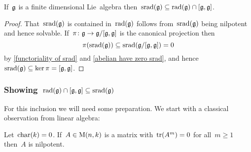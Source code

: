 \begin{corollary}
  \label{inclusion srad in intersection}
  If~$\mathfrak{g}$ is a finite dimensional Lie~algebra then~$\operatorname{srad}(\mathfrak{g}) \subseteq \operatorname{rad}(\mathfrak{g}) \cap [\mathfrak{g}, \mathfrak{g}]$.
\end{corollary}

\begin{proof}
  That~$\operatorname{srad}(\mathfrak{g})$ is contained in~$\operatorname{rad}(\mathfrak{g})$ follows from~$\operatorname{srad}(\mathfrak{g})$ being nilpotent and hence solvable.
  If~$\pi \colon \mathfrak{g} \to \mathfrak{g}/[\mathfrak{g}, \mathfrak{g}]$ is the canonical projection then
  \[
    \pi(\operatorname{srad}(\mathfrak{g}))
    \subseteq
    \operatorname{srad}(\mathfrak{g}/[\mathfrak{g}, \mathfrak{g}])
    =
    0
  \]
  by \cref{functoriality of srad} and \cref{abelian have zero srad}, and hence~$\operatorname{srad}(\mathfrak{g}) \subseteq \ker \pi = [\mathfrak{g}, \mathfrak{g}]$.
\end{proof}



\subsubsection*{Showing~$\operatorname{rad}(\mathfrak{g}) \cap [\mathfrak{g}, \mathfrak{g}] \subseteq \operatorname{srad}(\mathfrak{g})$}

For this inclusion we will need some preparation.
We start with a classical observation from linear algebra:

\begin{lemma}
  \label{trace zero lemma}
  Let~$\operatorname{char}(k) = 0$.
  If~$A \in \operatorname{M}(n, k)$ is a matrix with~$\operatorname{tr}(A^m) = 0$ for all~$m \geq 1$ then~$A$ is nilpotent.
\end{lemma}

